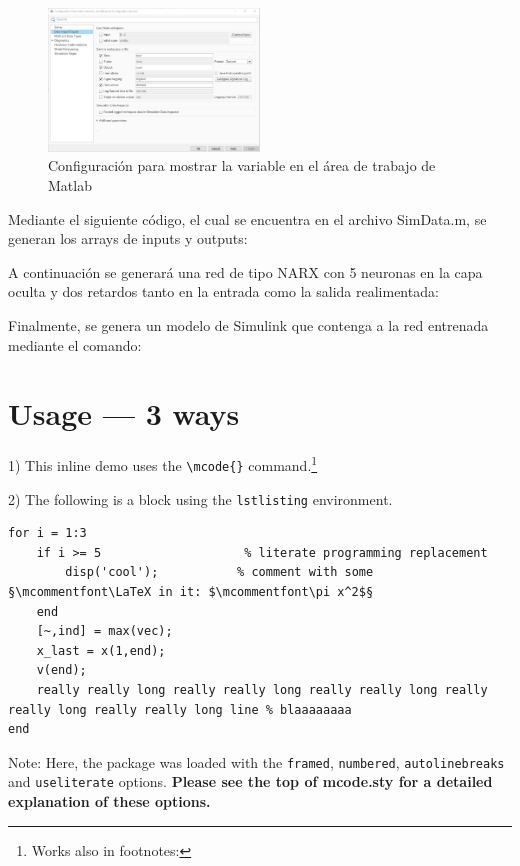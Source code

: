 \documentclass{article}
\begin{document}
\begin{figure}[h]
\caption{Configuración para mostrar la variable en el área de trabajo de Matlab}
\centering
\includegraphics[width=0.5\textwidth]{imagenes/ConfigOut.png}
\end{figure}
\newpage
Mediante el siguiente código, el cual se encuentra en el archivo SimData.m, se generan los arrays de inputs y outputs:


A continuación se generará una red de tipo NARX con 5 neuronas en la capa oculta y dos retardos tanto en la entrada como la salida realimentada:


Finalmente, se genera un modelo de Simulink que contenga a la red entrenada mediante el comando: 





















\section*{Usage --- 3 ways}

1) This inline demo  uses the \verb|\mcode{}| command.\footnote{Works also in footnotes: }

2) The following is a block using the \verb|lstlisting| environment.
\begin{lstlisting}
for i = 1:3
	if i >= 5                    % literate programming replacement
		disp('cool');           % comment with some §\mcommentfont\LaTeX in it: $\mcommentfont\pi x^2$§
	end
	[~,ind] = max(vec);
	x_last = x(1,end);
	v(end);
	really really long really really long really really long really really long really really long line % blaaaaaaaa
end
\end{lstlisting}
Note: Here, the package was loaded with the \verb|framed|, \verb|numbered|, \verb|autolinebreaks| and \verb|useliterate| options.  \textbf{Please see the top of mcode.sty for a detailed explanation of these options.}
\end{document}
